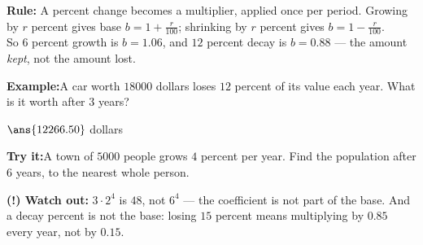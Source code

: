 \documentclass[12pt]{article}
\begin{document}
\begin{formulabox}
\textbf{Rule:} A percent change becomes a multiplier, applied once per period.
Growing by $r$ percent gives base $b = 1 + \frac{r}{100}$; shrinking by $r$
percent gives $b = 1 - \frac{r}{100}$.\\[3pt]
So $6$ percent growth is $b = 1.06$, and $12$ percent decay is $b = 0.88$ ---
the amount \emph{kept}, not the amount lost.
\end{formulabox}
\begin{examplebox}
\textbf{Example:}\quad A car worth $18000$ dollars loses $12$ percent of its
value each year. What is it worth after $3$ years?

$\ans{12266.50}$ dollars
\end{examplebox}
\begin{tryitbox}
\textbf{Try it:}\quad A town of $5000$ people grows $4$ percent per year. Find
the population after $6$ years, to the nearest whole person.\\[2pt]
\end{tryitbox}

\begin{watchoutbox}
\textbf{(!) Watch out:} $3 \cdot 2^{4}$ is $48$, not $6^{4}$ --- the coefficient
is not part of the base. And a decay percent is not the base: losing $15$
percent means multiplying by $0.85$ every year, not by $0.15$.
\end{watchoutbox}
\end{document}
